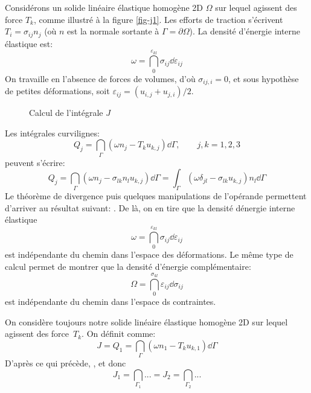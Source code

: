 Considérons un solide linéaire élastique homogène 2D $\Omega$ sur lequel agissent des force $T_k$, comme
illustré à la figure \ref{fig-j1}.
Les efforts de traction s'écrivent $T_i=\sigma_{ij}n_j$ (où $n$ est la normale sortante à $\Gamma=\partial\Omega$).
La densité d'énergie interne élastique est:
\begin{equation}
\omega=\dint_0^{\varepsilon_{kl}} \sigma_{ij}\dd\varepsilon_{ij}
\end{equation}
On travaille en l'absence de forces de volumes, d'où $\sigma_{ij,i}=0$, et sous hypothèse de petites déformations, soit $\varepsilon_{ij}=(u_{i,j}+u_{j,i})/2$.
\begin{figure}[ht]
\centering
{}\hspace{5em}
\caption{Calcul de l'intégrale $J$}
\end{figure}
Les intégrales curvilignes:
\begin{equation}
Q_j =\dint_\Gamma \left(\omega n_j- T_k u_{k,j}\right)\dd\Gamma,\qquad j, k=1,2,3
\end{equation}
peuvent s'écrire:
\begin{equation}
Q_j =\dint_\Gamma \left(\omega n_j- \sigma_{lk}n_l u_{k,j}\right)\dd\Gamma
=\int_\Gamma \left(\omega \delta_{jl}- \sigma_{lk} u_{k,j}\right)n_l \dd\Gamma
\end{equation}
Le théorème de divergence puis quelques manipulations de l'opérande permettent d'arriver au résultat
suivant: . De là, on en tire que la densité dénergie interne élastique
\begin{equation}\omega=\dint_0^{\varepsilon_{kl}} \sigma_{ij}\dd\varepsilon_{ij}\end{equation}
est indépendante du chemin dans l'espace des déformations.
Le même type de calcul permet de montrer que la densité d'énergie complémentaire:
\begin{equation}\Omega = \dint_0^{\sigma_{kl}} \varepsilon_{ij}\dd\sigma_{ij}\end{equation}
est indépendante du chemin dans l'espace ds contraintes.

\medskip
On considère toujours notre solide linéaire élastique homogène 2D sur lequel agissent des
force~$T_k$. On définit  comme:
\begin{equation} J = Q_1 =\dint_\Gamma \left(\omega n_1- T_k u_{k,1}\right)\dd\Gamma \end{equation}
D'après ce qui précède, , et donc
\begin{equation}J_1=\dint_{\Gamma_1} ... = J_2=\dint_{\Gamma_2} ...\end{equation}

